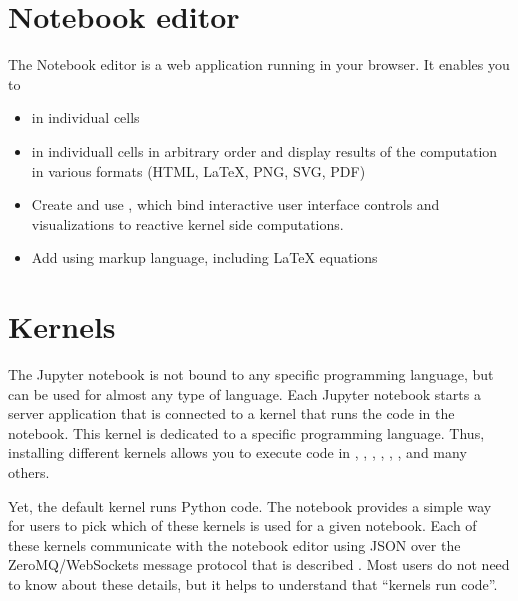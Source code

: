 \documentclass[letterpaper,10pt,english]{sphinxmanual}
\begin{document}
\section{Notebook editor}
\label{\detokenize{notebooks/Intro/Introduction2Jupyter:Notebook-editor}}
\sphinxAtStartPar
The Notebook editor is a web application running in your browser. It enables you to
\begin{itemize}
\item {} 
\sphinxAtStartPar
{} in individual cells

\item {} 
\sphinxAtStartPar
{} in individuall cells in arbitrary order and display results of the computation in various formats (HTML, LaTeX, PNG, SVG, PDF)

\item {} 
\sphinxAtStartPar
Create and use , which bind interactive user interface controls and visualizations to reactive kernel side computations.

\item {} 
\sphinxAtStartPar
Add  using  markup language, including LaTeX equations

\end{itemize}


\section{Kernels}
\label{\detokenize{notebooks/Intro/Introduction2Jupyter:Kernels}}
\sphinxAtStartPar
The Jupyter notebook is not bound to any specific programming language, but can be used for almost any type of language. Each Jupyter notebook starts a server application that is connected to a kernel that runs the code in the notebook. This kernel is dedicated to a specific programming language. Thus, installing different kernels  allows you to execute code in , , , , ,
, and many others.

\sphinxAtStartPar
Yet, the default kernel runs Python code. The notebook provides a simple way for users to pick which of these kernels is used for a given notebook. Each of these kernels communicate with the notebook editor using JSON over the ZeroMQ/WebSockets message protocol that is described . Most users do not need to know about these details, but it helps to understand that “kernels run code”.
\end{document}
